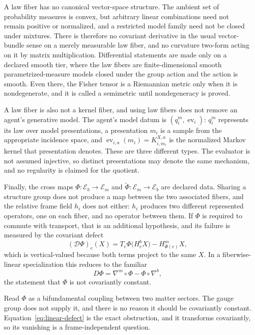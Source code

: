 \documentclass[11pt,letterpaper]{article}
\begin{document}
A law fiber has no canonical vector-space structure. The ambient set of probability measures is convex, but arbitrary linear combinations need not remain positive or normalized, and a restricted model family need not be closed under mixtures. There is therefore no covariant derivative in the usual vector-bundle sense on a merely measurable law fiber, and no curvature two-form acting on it by matrix multiplication. Differential statements are made only on a declared smooth tier, where the law fibers are finite-dimensional smooth parametrized-measure models closed under the group action and the action is smooth. Even there, the Fisher tensor is a Riemannian metric only when it is nondegenerate, and it is called a semimetric until nondegeneracy is proved.

A law fiber is also not a kernel fiber, and using law fibers does not remove an agent's generative model. The agent's model datum is \((q_i^m,\operatorname{ev}_i)\): \(q_i^m\) represents its law over model presentations, a presentation \(m_i\) is a sample from the appropriate incidence space, and \(\operatorname{ev}_{i,a}(m_i)=K^{X,a}_{i,m_i}\) is the normalized Markov kernel that presentation denotes. These are three different types. The evaluator is not assumed injective, so distinct presentations may denote the same mechanism, and no regularity is claimed for the quotient.

Finally, the cross maps \(\Phi:\mathcal E_b\to\mathcal E_m\) and \(\widetilde\Phi:\mathcal E_m\to\mathcal E_b\) are declared data. Sharing a structure group does not produce a map between the two associated fibers, and the relative frame field \(h_i\) does not either: \(h_i\) produces two different represented operators, one on each fiber, and no operator between them. If \(\Phi\) is required to commute with transport, that is an additional hypothesis, and its failure is measured by the covariant defect
\begin{equation}
  (\mathcal D\Phi)_e(X)=T_e\Phi\bigl(H^b_eX\bigr)-H^m_{\Phi(e)}X,
  \label{eq:covariant-defect}
\end{equation}
which is vertical-valued because both terms project to the same \(X\). In a fiberwise-linear specialization this reduces to the familiar
\begin{equation}
  D\Phi=\nabla^m\circ\Phi-\Phi\circ\nabla^b,
  \label{eq:linear-defect}
\end{equation}
the statement that \(\Phi\) is not covariantly constant.

\begin{physicalreading}
Read \(\Phi\) as a bifundamental coupling between two matter sectors. The gauge group does not supply it, and there is no reason it should be covariantly constant. Equation~\eqref{eq:linear-defect} is the exact obstruction, and it transforms covariantly, so its vanishing is a frame-independent question.
\end{physicalreading}
\end{document}
